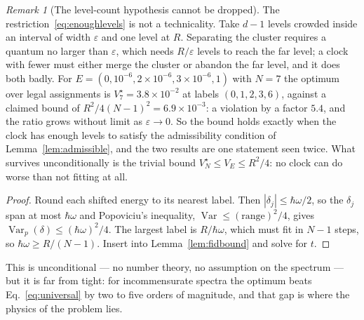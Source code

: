 \documentclass[aps,prd,onecolumn,notitlepage,10pt,amsmath,amssymb,amsfonts,nofootinbib]{revtex4-2}
\theoremstyle{definition}
\theoremstyle{remark}
\newtheorem{remark}{Remark}
\begin{document}
\begin{remark}[The level-count hypothesis cannot be dropped]
\label{rem:boundfails}
The restriction~\eqref{eq:enoughlevels} is not a technicality. Take $d-1$ levels crowded inside an interval of width $\varepsilon$ and one level at $R$. Separating the cluster requires a quantum no larger than $\varepsilon$, which needs $R/\varepsilon$ levels to reach the far level; a clock with fewer must either merge the cluster or abandon the far level, and it does both badly. For $E=(0,10^{-6},2\times10^{-6},3\times10^{-6},1)$ with $N=7$ the optimum over legal assignments is $V^\star_7=3.8\times10^{-2}$ at labels $(0,1,2,3,6)$, against a claimed bound of $R^2/4(N-1)^2=6.9\times10^{-3}$: a violation by a factor $5.4$, and the ratio grows without limit as $\varepsilon\to0$. So the bound holds exactly when the clock has enough levels to satisfy the admissibility condition of Lemma~\ref{lem:admissible}, and the two results are one statement seen twice. What survives unconditionally is the trivial bound $V^\star_N\le V_E\le R^2/4$: no clock can do worse than not fitting at all.
\end{remark}
\begin{proof}
Round each shifted energy to its nearest label. Then $|\delta_j|\le\hbar\omega/2$, so the $\delta_j$ span at most $\hbar\omega$ and Popoviciu's inequality, $\operatorname{Var}\le(\text{range})^2/4$, gives $\operatorname{Var}_p(\delta)\le(\hbar\omega)^2/4$. The largest label is $R/\hbar\omega$, which must fit in $N-1$ steps, so $\hbar\omega\ge R/(N-1)$. Insert into Lemma~\ref{lem:fidbound} and solve for $t$.
\end{proof}

This is unconditional --- no number theory, no assumption on the spectrum --- but it is far from tight: for incommensurate spectra the optimum beats Eq.~\eqref{eq:universal} by two to five orders of magnitude, and that gap is where the physics of the problem lies.
\end{document}
